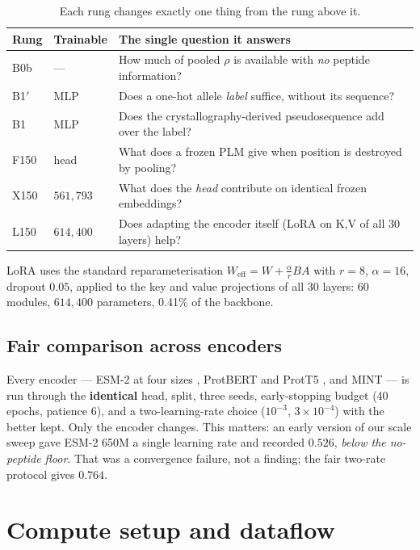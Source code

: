 \documentclass[11pt,a4paper]{article}
\begin{document}
\begin{table}[H]
\centering\small
\begin{tabular}{@{}llp{74mm}@{}}
\toprule
\textbf{Rung} & \textbf{Trainable} & \textbf{The single question it answers} \\
\midrule
B0b & --- & How much of pooled $\rho$ is available with \emph{no} peptide information? \\
B1$'$ & MLP & Does a one-hot allele \emph{label} suffice, without its sequence? \\
B1 & MLP & Does the crystallography-derived pseudosequence add over the label? \\
F150 & head & What does a frozen PLM give when position is destroyed by pooling? \\
X150 & $561{,}793$ & What does the \emph{head} contribute on identical frozen embeddings? \\
L150 & $614{,}400$ & Does adapting the encoder itself (LoRA on K,V of all 30 layers) help? \\
\bottomrule
\end{tabular}
\caption{Each rung changes exactly one thing from the rung above it.}
\end{table}

LoRA uses the standard reparameterisation \citep{hu2022lora}
\(W_{\text{eff}} = W + \tfrac{\alpha}{r}BA\) with $r=8$, $\alpha=16$, dropout $0.05$, applied to
the key and value projections of all 30 layers: 60 modules, $614{,}400$ parameters, 0.41\% of the
backbone.

\subsection{Fair comparison across encoders}

Every encoder --- ESM-2 at four sizes \citep{lin2023esm2}, ProtBERT and ProtT5
\citep{elnaggar2021prottrans}, and MINT \citep{ullanat2026mint} --- is run through the
\textbf{identical} head, split, three seeds, early-stopping budget (40 epochs, patience 6), and a
two-learning-rate choice ($10^{-3}$, $3\times10^{-4}$) with the better kept. Only the encoder
changes. This matters: an early version of our scale sweep gave ESM-2 650M a single learning rate
and recorded $0.526$, \emph{below the no-peptide floor}. That was a convergence failure, not a
finding; the fair two-rate protocol gives $0.764$.

\section{Compute setup and dataflow}
\end{document}
